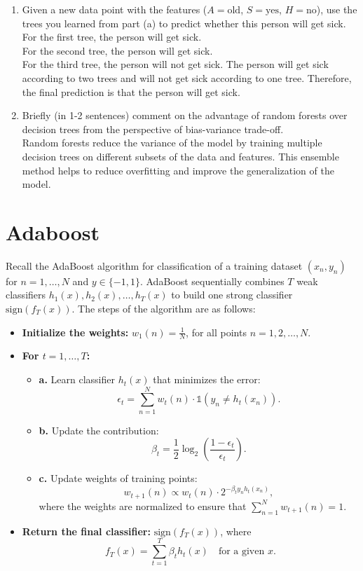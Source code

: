 \documentclass[a3paper,12pt]{extarticle} %
\begin{document}
\begin{enumerate}
        \item  Given a new data point with the features ($A = \text{old}$, $S = \text{yes}$, $H = \text{no}$), use the trees you learned from part (a) to predict whether this person will get sick.
        \\ For the first tree, the person will get sick.
        \\ For the second tree, the person will get sick.
        \\ For the third tree, the person will not get sick.
        The person will get sick according to two trees and will not get sick according to one tree. Therefore, the final prediction is that the person will get sick.
        \item  Briefly (in 1-2 sentences) comment on the advantage of random forests over decision trees from the perspective of bias-variance trade-off.
        \\ Random forests reduce the variance of the model by training multiple decision trees on different subsets of the data and features. This ensemble method helps to reduce overfitting and improve the generalization of the model.
    \end{enumerate}

\newpage
\section{Adaboost}
Recall the AdaBoost algorithm for classification of a training dataset $(x_n, y_n)$ for $n = 1, \dots, N$ and $y \in \{-1, 1\}$. AdaBoost sequentially combines $T$ weak classifiers $h_1(x), h_2(x), \dots, h_T(x)$ to build one strong classifier $\text{sign}(f_T(x))$. The steps of the algorithm are as follows:
\begin{itemize}
    \item \textbf{Initialize the weights:} $w_1(n) = \frac{1}{N}$, for all points $n = 1, 2, \dots, N$.
    \item \textbf{For $t = 1, \dots, T$:}
    \begin{itemize}
        \item \textbf{a.} Learn classifier $h_t(x)$ that minimizes the error:
        \[
        \epsilon_t = \sum_{n=1}^N w_t(n) \cdot \mathbb{1}(y_n \neq h_t(x_n)).
        \]
        \item \textbf{b.} Update the contribution:
        \[
        \beta_t = \frac{1}{2} \log_2\left(\frac{1 - \epsilon_t}{\epsilon_t}\right).
        \]
        \item \textbf{c.} Update weights of training points:
        \[
        w_{t+1}(n) \propto w_t(n) \cdot 2^{-\beta_t y_n h_t(x_n)},
        \]
        where the weights are normalized to ensure that $\sum_{n=1}^N w_{t+1}(n) = 1$.
    \end{itemize}
    \item \textbf{Return the final classifier:} $\text{sign}(f_T(x))$, where
    \[
    f_T(x) = \sum_{t=1}^T \beta_t h_t(x) \quad \text{for a given } x.
    \]
\end{itemize}
\end{document}
